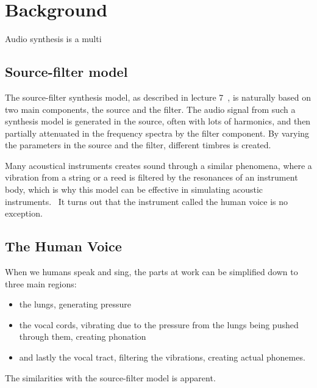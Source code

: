 \documentclass{article}
\title{\papertitle}
\begin{document}
%
\capstartfalse
\maketitle
\capstarttrue
%
\begin{abstract}
Lorem Ipsum
\end{abstract}
%
\section{Background}\label{sec:introduction}
Audio synthesis is a multi

\subsection{Source-filter model}
The source-filter synthesis model, as described in lecture 7~\cite{ternstrom7:20}, is naturally based on two main components, the source and the filter. The audio signal from such a synthesis model is generated in the source, often with lots of harmonics, and then partially attenuated in the frequency spectra by the filter component. By varying the parameters in the source and the filter, different timbres is created.

Many acoustical instruments creates sound through a similar phenomena, where a vibration from a string or a reed is filtered by the resonances of an instrument body, which is why this model can be effective in simulating acoustic instruments.~\cite{ternstrom7:20} It turns out that the instrument called the human voice is no exception.~\cite{ternstrom8:20}

\subsection{The Human Voice}
When we humans speak and sing, the parts at work can be simplified down to three main regions:~\cite{ternstrom8:20, hall:91}
\begin{itemize}
\item the lungs, generating pressure
\item the vocal cords, vibrating due to the pressure from the lungs being pushed through them, creating phonation
\item and lastly the vocal tract, filtering the vibrations, creating actual phonemes.
\end{itemize}

The similarities with the source-filter model is apparent.
\end{document}
